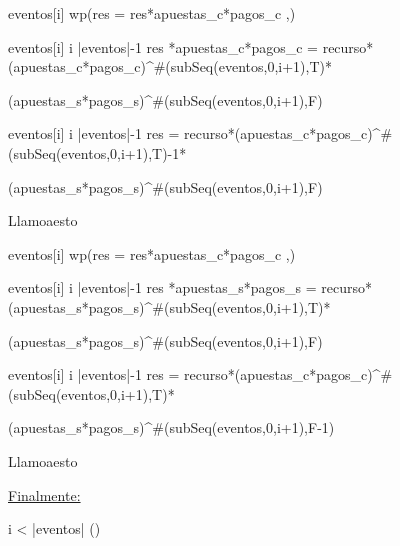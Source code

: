 eventos[i] \wedge wp(res = res*apuestas_c*pagos_c ,\Delta) 
\vspace{0.2cm}

\equiv eventos[i] \leq i \leq |eventos|-1 \wedge res *apuestas_c*pagos_c = recurso*(apuestas_c*pagos_c)^{\#(subSeq(eventos,0,i+1),T)}*
\vspace{0.2cm}

(apuestas_s*pagos_s)^{\#(subSeq(eventos,0,i+1),F)}
\vspace{0.2cm}

\equiv eventos[i] \leq i \leq |eventos|-1 \wedge res = recurso*(apuestas_c*pagos_c)^{\#(subSeq(eventos,0,i+1),T)-1}* 
\vspace{0.2cm}

(apuestas_s*pagos_s)^{\#(subSeq(eventos,0,i+1),F)}
\vspace{0.4cm}

Llamo\hspace{3}a\hspace{3}esto\hspace{3}\star
\vspace{0.4cm}

\neg eventos[i] \wedge wp(res = res*apuestas_c*pagos_c ,\Delta) 
\vspace{0.2cm}

\equiv \neg eventos[i] \leq i \leq |eventos|-1 \wedge res *apuestas_s*pagos_s = recurso*(apuestas_s*pagos_s)^{\#(subSeq(eventos,0,i+1),T)}*
\vspace{0.2cm}

(apuestas_s*pagos_s)^{\#(subSeq(eventos,0,i+1),F)}
\vspace{0.2cm}

\equiv \neg eventos[i] \leq i \leq |eventos|-1 \wedge res = recurso*(apuestas_c*pagos_c)^{\#(subSeq(eventos,0,i+1),T)}* 
\vspace{0.2cm}

(apuestas_s*pagos_s)^{\#(subSeq(eventos,0,i+1),F-1)}
\vspace{0.4cm}

Llamo\hspace{3}a\hspace{3}esto\hspace{3}\heartsuit
\vspace{0.4cm}

\underline{Finalmente:}
\vspace{0.4cm}

\leq i < |eventos| \wedge (\star \vee \heartsuit)
\vspace{0.2cm}

